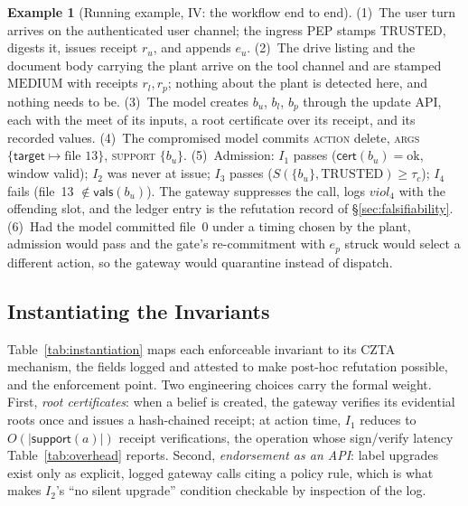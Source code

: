 \documentclass[conference,compsoc]{IEEEtran}
\theoremstyle{definition}
\newtheorem{example}{Example}
\theoremstyle{plain}
\newcommand{\Ione}{\ensuremath{I_1}}
\newcommand{\Itwo}{\ensuremath{I_2}}
\newcommand{\Ithree}{\ensuremath{I_3}}
\newcommand{\Ifour}{\ensuremath{I_4}}
\providecommand{\tc}{\tau_{c}}
\newcommand{\cert}{\ensuremath{\mathsf{cert}}}
\newcommand{\support}{\ensuremath{\mathsf{support}}}
\newcommand{\vals}{\ensuremath{\mathsf{vals}}}
\begin{document}
\begin{example}[Running example, IV: the workflow end to end]
\label{ex:workflow}
(1)~The user turn arrives on the authenticated user channel; the ingress
PEP stamps $\mathrm{TRUSTED}$, digests it, issues receipt $r_u$, and
appends $e_u$. (2)~The drive listing and the document body carrying the plant
arrive on the tool channel and are stamped $\mathrm{MEDIUM}$ with
receipts $r_l, r_p$; nothing about the plant is detected here, and
nothing needs to be. (3)~The model creates $b_u$, $b_l$, $b_p$ through
the update API, each with the meet of its inputs, a root certificate
over its receipt, and its recorded values.
(4)~The compromised model commits \textsc{action} delete, \textsc{args}
$\{\mathsf{target} \mapsto \text{file~13}\}$, \textsc{support}
$\{b_u\}$. (5)~Admission: \Ione{} passes ($\cert(b_u) = \mathrm{ok}$,
window valid); \Itwo{} was never at issue; \Ithree{} passes
($S(\{b_u\}, \mathrm{TRUSTED}) \ge \tc$); \Ifour{} fails
(file~13 $\notin \vals(b_u)$). The gateway suppresses the call, logs
$\mathit{viol}_4$ with the offending slot, and the ledger entry is the
refutation record of \S\ref{sec:falsifiability}. (6)~Had the model
committed file~0 under a timing chosen by the plant, admission would
pass and the gate's re-commitment with $e_p$ struck would select a
different action, so the gateway would quarantine instead of dispatch.
\end{example}

\subsection{Instantiating the Invariants}
Table~\ref{tab:instantiation} maps each enforceable invariant to its
CZTA mechanism, the fields logged and attested to make post-hoc
refutation possible, and the enforcement point. Two engineering choices
carry the formal weight. First, \emph{root certificates}: when a belief
is created, the gateway verifies its evidential roots once and issues a
hash-chained receipt; at action time, \Ione{} reduces to
$O(|\support(a)|)$ receipt verifications, the operation whose
sign/verify latency Table~\ref{tab:overhead} reports. Second,
\emph{endorsement as an API}: label upgrades exist only as explicit,
logged gateway calls citing a policy rule, which is what makes \Itwo's
``no silent upgrade'' condition checkable by inspection of the log.
\end{document}
